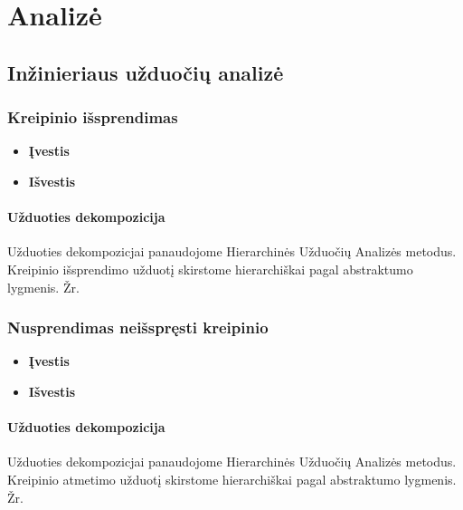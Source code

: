 
\section{Analizė}

\subsection{Inžinieriaus užduočių analizė}

	\subsubsection{Kreipinio išsprendimas}
	
		\begin{itemize}
			\item \textbf{Įvestis}
			\item \textbf{Išvestis} 
		\end{itemize}
		
	\paragraph{Užduoties dekompozicija}
	
	Užduoties dekompozicjai panaudojome Hierarchinės Užduočių Analizės metodus.
	Kreipinio išsprendimo užduotį skirstome hierarchiškai pagal abstraktumo lygmenis. 
	Žr. 
 		
	
	\subsubsection{Nusprendimas neišspręsti kreipinio}
	
		\begin{itemize}
			\item \textbf{Įvestis}
			\item \textbf{Išvestis} 
		\end{itemize}
		
	\paragraph{Užduoties dekompozicija} 
	
	Užduoties dekompozicjai panaudojome Hierarchinės Užduočių Analizės metodus.
	Kreipinio atmetimo užduotį skirstome hierarchiškai pagal abstraktumo lygmenis. 
	Žr. 
 		
